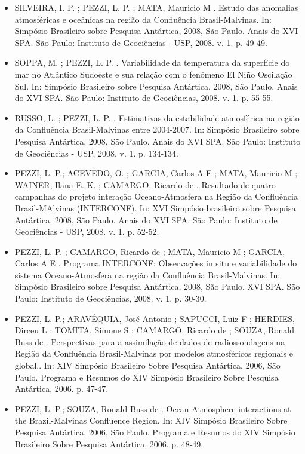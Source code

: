 \documentclass[11pt, a4paper]{awesome-cv}
\begin{document}
\begin{cvletter}
\begin{itemize}
\item[] SILVEIRA, I. P. ; PEZZI, L. P. ; MATA, Mauricio M . Estudo das anomalias atmosféricas e oceânicas na região da Confluência Brasil-Malvinas. In: Simpósio Brasileiro sobre Pesquisa Antártica, 2008, São Paulo. Anais do XVI SPA. São Paulo: Instituto de Geociências - USP, 2008. v. 1. p. 49-49. 
\item[] SOPPA, M. ; PEZZI, L. P. . Variabilidade da temperatura da superfície do mar no Atlântico Sudoeste e sua relação com o fenômeno El Niño Oscilação Sul. In: Simpósio Brasileiro sobre Pesquisa Antártica, 2008, São Paulo. Anais do XVI SPA. São Paulo: Instituto de Geociências, 2008. v. 1. p. 55-55. 
\item[] RUSSO, L. ; PEZZI, L. P. . Estimativas da estabilidade atmosférica na região da Confluência Brasil-Malvinas entre 2004-2007. In: Simpósio Brasileiro sobre Pesquisa Antártica, 2008, São Paulo. Anais do XVI SPA. São Paulo: Instituto de Geociências - USP, 2008. v. 1. p. 134-134. 
\item[] PEZZI, L. P.; ACEVEDO, O. ; GARCIA, Carlos A E ; MATA, Mauricio M ; WAINER, Ilana E. K. ; CAMARGO, Ricardo de . Resultado de quatro campanhas do projeto interação Oceano-Atmosfera na Região da Confluência Brasil-MAlvinas (INTERCONF). In: XVI Simpósio brasileiro sobre Pesquisa Antártica, 2008, São Paulo. Anais do XVI SPA. São Paulo: Instituto de Geociências - USP, 2008. v. 1. p. 52-52. 
\item[] PEZZI, L. P. ; CAMARGO, Ricardo de ; MATA, Mauricio M ; GARCIA, Carlos A E . Programa INTERCONF: Observações in situ e variabilidade do sistema Oceano-Atmosfera na região da Confluência Brasil-Malvinas. In: Simpósio Brasileiro sobre Pesquisa Antártica, 2008, São Paulo. XVI SPA. São Paulo: Instituto de Geociências, 2008. v. 1. p. 30-30. 
\item[] PEZZI, L. P.; ARAVÉQUIA, José Antonio ; SAPUCCI, Luiz F ; HERDIES, Dirceu L ; TOMITA, Simone S ; CAMARGO, Ricardo de ; SOUZA, Ronald Buss de . Perspectivas para a assimilação de dados de radiossondagens na Região da Confluência Brasil-Malvinas por modelos atmosféricos regionais e global.. In: XIV Simpósio Brasileiro Sobre Pesquisa Antártica, 2006, São Paulo. Programa e Resumos do XIV Simpósio Brasileiro Sobre Pesquisa Antártica, 2006. p. 47-47. 
\item[] PEZZI, L. P.; SOUZA, Ronald Buss de . Ocean-Atmosphere interactions at the Brazil-Malvinas Confluence Region. In: XIV Simpósio Brasileiro Sobre Pesquisa Antártica, 2006, São Paulo. Programa e Resumos do XIV Simpósio Brasileiro Sobre Pesquisa Antártica, 2006. p. 48-49. 
\end{itemize}

\end{cvletter}
\end{document}
